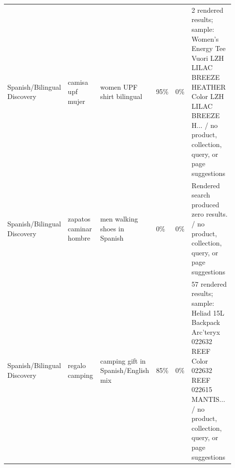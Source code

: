 \documentclass[10pt]{article}
\begin{document}
{\begin{longtable}{@{}L{0.16\linewidth}L{0.16\linewidth}L{0.17\linewidth}R{0.08\linewidth}R{0.08\linewidth}L{0.27\linewidth}@{}}
Spanish/Bilingual Discovery & camisa upf mujer & women UPF shirt bilingual & 95\% & 0\% & 2 rendered results; sample: Women's Energy Tee Vuori LZH LILAC BREEZE HEATHER Color LZH LILAC BREEZE H... / no product, collection, query, or page suggestions\\
Spanish/Bilingual Discovery & zapatos caminar hombre & men walking shoes in Spanish & 0\% & 0\% & Rendered search produced zero results. / no product, collection, query, or page suggestions\\
Spanish/Bilingual Discovery & regalo camping & camping gift in Spanish/English mix & 85\% & 0\% & 57 rendered results; sample: Heliad 15L Backpack Arc'teryx 022632 REEF Color 022632 REEF 022615 MANTIS... / no product, collection, query, or page suggestions\\
\bottomrule
\end{longtable}
}
\end{document}
